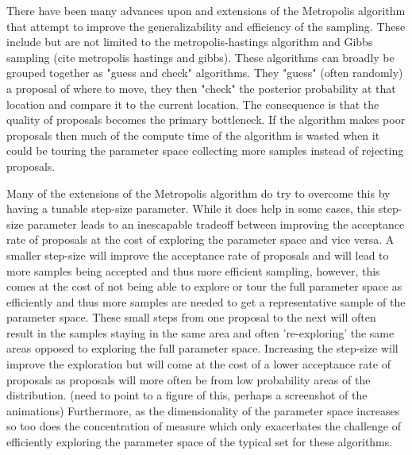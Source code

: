 There have been many advances upon and extensions of the Metropolis algorithm that attempt to improve the generalizability and efficiency of the sampling. These include but are not limited to the metropolis-hastings algorithm and Gibbs sampling (cite metropolis hastings and gibbs). These algorithms can broadly be grouped together as "guess and check" algorithms. They "guess" (often randomly) a proposal of where to move, they then "check" the posterior probability at that location and compare it to the current location. The consequence is that the quality of proposals becomes the primary bottleneck. If the algorithm makes poor proposals then much of the compute time of the algorithm is wasted when it could be touring the parameter space collecting more samples instead of rejecting proposals.

Many of the extensions of the Metropolis algorithm do try to overcome this by having a tunable step-size parameter. While it does help in some cases, this step-size parameter leads to an inescapable tradeoff between improving the acceptance rate of proposals at the cost of exploring the parameter space and vice versa. A smaller step-size will improve the acceptance rate of proposals and will lead to more samples being accepted and thus more efficient sampling, however, this comes at the cost of not being able to explore or tour the full parameter space as efficiently and thus more samples are needed to get a representative sample of the parameter space. These small steps from one proposal to the next will often result in the samples staying in the same area and often 're-exploring' the same areas opposed to exploring the full parameter space. Increasing the step-size will improve the exploration but will come at the cost of a lower acceptance rate of proposals as proposals will more often be from low probability areas of the distribution. (need to point to a figure of this, perhaps a screenshot of the animations) Furthermore, as the dimensionality of the parameter space increases so too does the concentration of measure which only exacerbates the challenge of efficiently exploring the parameter space of the typical set for these algorithms.


